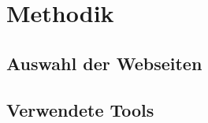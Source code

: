 \section{Methodik}
\label{sec:methodik}


\subsection{Auswahl der Webseiten}
\label{sec:auswahl_der_webseiten}


\subsection{Verwendete Tools}
\label{sec:verwendete_tools}

